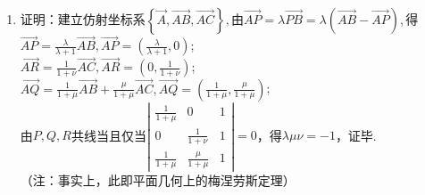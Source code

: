 \documentclass[UTF8]{ctexart}
\begin{document}
\begin{enumerate}
\item 证明：建立仿射坐标系$\left\{\overrightarrow{A},\overrightarrow{AB},\overrightarrow{AC}\right\},$由$\overrightarrow{AP}=\lambda\overrightarrow{PB}=\lambda\left(\overrightarrow{AB}-\overrightarrow{AP}\right),$得$\overrightarrow{AP}=\displaystyle\frac{\lambda}{\lambda+1}\overrightarrow{AB},\overrightarrow{AP}=\left(\displaystyle\frac{\lambda}{\lambda+1},0\right)$;\\
$\overrightarrow{AR}=\displaystyle\frac{1}{1+\nu}\overrightarrow{AC},\overrightarrow{AR}=\left(0,\displaystyle\frac{1}{1+\nu}\right)$;\\
$\overrightarrow{AQ}=\displaystyle\frac{1}{1+\mu}\overrightarrow{AB}+\displaystyle\frac{\mu}{1+\mu}\overrightarrow{AC},\overrightarrow{AQ}=\left(\displaystyle\frac{1}{1+\mu},\displaystyle\frac{\mu}{1+\mu}\right)$;\\
由$P,Q,R$共线当且仅当$\left|\begin{array}{ccc}\displaystyle\frac{1}{1+\mu}&0&1\\ 0&\displaystyle\frac{1}{1+\nu}&1\\ \displaystyle\frac{1}{1+\mu}&\displaystyle\frac{\mu}{1+\mu}&1\end{array}\right|=0$，得$\lambda\mu\nu=-1$，证毕. \\
（注：事实上，此即平面几何上的梅涅劳斯定理）
\end{enumerate}
\end{document}
